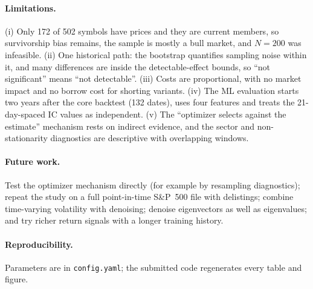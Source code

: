 \documentclass[11pt,a4paper]{article}
\begin{document}
\paragraph{Limitations.} (i) Only 172 of 502 symbols have prices and they are current members, so survivorship bias
remains, the sample is mostly a bull market, and $N=200$ was infeasible. (ii) One historical path: the bootstrap
quantifies sampling noise within it, and many differences are inside the detectable-effect bounds, so ``not
significant'' means ``not detectable''. (iii) Costs are proportional, with no market impact and no borrow cost for
shorting variants. (iv) The ML evaluation starts two years after the core backtest (132 dates), uses four features
and treats the 21-day-spaced IC values as independent. (v) The ``optimizer selects against the estimate'' mechanism
rests on indirect evidence, and the sector and non-stationarity diagnostics are descriptive with overlapping windows.

\paragraph{Future work.} Test the optimizer mechanism directly (for example by resampling diagnostics); repeat the
study on a full point-in-time S\&P~500 file with delistings; combine time-varying volatility with denoising;
denoise eigenvectors as well as eigenvalues; and try richer return signals with a longer training history.

\paragraph{Reproducibility.} Parameters are in \texttt{config.yaml}; the submitted code regenerates every table and figure.
\end{document}
